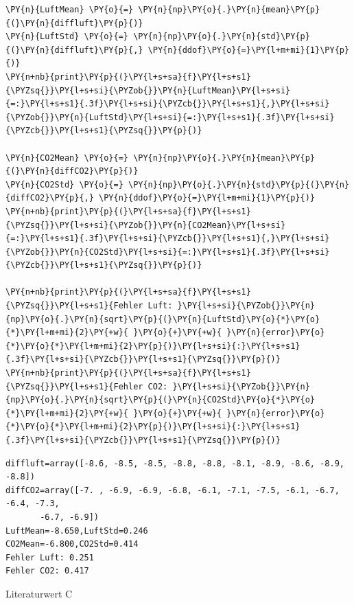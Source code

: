 \begin{tcolorbox}[breakable, size=fbox, boxrule=1pt, pad at break*=1mm,colback=cellbackground, colframe=cellborder]
\begin{Verbatim}[commandchars=\\\{\}]
\PY{n}{LuftMean} \PY{o}{=} \PY{n}{np}\PY{o}{.}\PY{n}{mean}\PY{p}{(}\PY{n}{diffluft}\PY{p}{)}
\PY{n}{LuftStd} \PY{o}{=} \PY{n}{np}\PY{o}{.}\PY{n}{std}\PY{p}{(}\PY{n}{diffluft}\PY{p}{,} \PY{n}{ddof}\PY{o}{=}\PY{l+m+mi}{1}\PY{p}{)}
\PY{n+nb}{print}\PY{p}{(}\PY{l+s+sa}{f}\PY{l+s+s1}{\PYZsq{}}\PY{l+s+si}{\PYZob{}}\PY{n}{LuftMean}\PY{l+s+si}{=:}\PY{l+s+s1}{.3f}\PY{l+s+si}{\PYZcb{}}\PY{l+s+s1}{,}\PY{l+s+si}{\PYZob{}}\PY{n}{LuftStd}\PY{l+s+si}{=:}\PY{l+s+s1}{.3f}\PY{l+s+si}{\PYZcb{}}\PY{l+s+s1}{\PYZsq{}}\PY{p}{)}

\PY{n}{CO2Mean} \PY{o}{=} \PY{n}{np}\PY{o}{.}\PY{n}{mean}\PY{p}{(}\PY{n}{diffCO2}\PY{p}{)}
\PY{n}{CO2Std} \PY{o}{=} \PY{n}{np}\PY{o}{.}\PY{n}{std}\PY{p}{(}\PY{n}{diffCO2}\PY{p}{,} \PY{n}{ddof}\PY{o}{=}\PY{l+m+mi}{1}\PY{p}{)}
\PY{n+nb}{print}\PY{p}{(}\PY{l+s+sa}{f}\PY{l+s+s1}{\PYZsq{}}\PY{l+s+si}{\PYZob{}}\PY{n}{CO2Mean}\PY{l+s+si}{=:}\PY{l+s+s1}{.3f}\PY{l+s+si}{\PYZcb{}}\PY{l+s+s1}{,}\PY{l+s+si}{\PYZob{}}\PY{n}{CO2Std}\PY{l+s+si}{=:}\PY{l+s+s1}{.3f}\PY{l+s+si}{\PYZcb{}}\PY{l+s+s1}{\PYZsq{}}\PY{p}{)}

\PY{n+nb}{print}\PY{p}{(}\PY{l+s+sa}{f}\PY{l+s+s1}{\PYZsq{}}\PY{l+s+s1}{Fehler Luft: }\PY{l+s+si}{\PYZob{}}\PY{n}{np}\PY{o}{.}\PY{n}{sqrt}\PY{p}{(}\PY{n}{LuftStd}\PY{o}{*}\PY{o}{*}\PY{l+m+mi}{2}\PY{+w}{ }\PY{o}{+}\PY{+w}{ }\PY{n}{error}\PY{o}{*}\PY{o}{*}\PY{l+m+mi}{2}\PY{p}{)}\PY{l+s+si}{:}\PY{l+s+s1}{.3f}\PY{l+s+si}{\PYZcb{}}\PY{l+s+s1}{\PYZsq{}}\PY{p}{)}
\PY{n+nb}{print}\PY{p}{(}\PY{l+s+sa}{f}\PY{l+s+s1}{\PYZsq{}}\PY{l+s+s1}{Fehler CO2: }\PY{l+s+si}{\PYZob{}}\PY{n}{np}\PY{o}{.}\PY{n}{sqrt}\PY{p}{(}\PY{n}{CO2Std}\PY{o}{*}\PY{o}{*}\PY{l+m+mi}{2}\PY{+w}{ }\PY{o}{+}\PY{+w}{ }\PY{n}{error}\PY{o}{*}\PY{o}{*}\PY{l+m+mi}{2}\PY{p}{)}\PY{l+s+si}{:}\PY{l+s+s1}{.3f}\PY{l+s+si}{\PYZcb{}}\PY{l+s+s1}{\PYZsq{}}\PY{p}{)}
\end{Verbatim}
\end{tcolorbox}

    \begin{Verbatim}[commandchars=\\\{\}]
diffluft=array([-8.6, -8.5, -8.5, -8.8, -8.8, -8.1, -8.9, -8.6, -8.9, -8.8])
diffCO2=array([-7. , -6.9, -6.9, -6.8, -6.1, -7.1, -7.5, -6.1, -6.7, -6.4, -7.3,
       -6.7, -6.9])
LuftMean=-8.650,LuftStd=0.246
CO2Mean=-6.800,CO2Std=0.414
Fehler Luft: 0.251
Fehler CO2: 0.417
    \end{Verbatim}

    Literaturwert C

